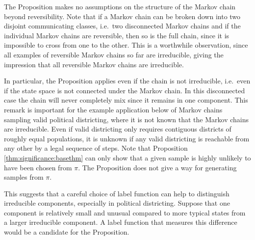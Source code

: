 \documentclass[12pt]{article}
\begin{document}
\begin{remark}
    The Proposition makes no assumptions on the structure of the Markov
    chain beyond reversibility.  Note that if a Markov chain can be
    broken down into two disjoint communicating classes, i.e.\ two
    disconnected Markov chains and if the individual Markov chains are
    reversible, then so is the full chain, since it is impossible to
    cross from one to the other.  This is a worthwhile observation,
    since all examples of reversible Markov chains so far are
    irreducible, giving the impression that all reversible Markov chains
    are irreducible.

    In particular, the Proposition applies even if the chain is not
    irreducible, i.e.\ even if the state space is not connected
    under the Markov chain.  In this disconnected case the chain will never
    completely mix since it remains in one component. This remark is
    important for the example application below of Markov chains
    sampling valid political districting, where it is not known that the
    Markov chains are irreducible.  Even if valid districting only
    requires contiguous districts of roughly equal populations, it is
    unknown if any valid districting is reachable from any other by a
    legal sequence of steps.  Note that Proposition~%
    \ref{thm:significance:basethm} can only show that a given sample is
    highly unlikely to have been chosen from \( \pi \).  The Proposition
    does not give a way for generating samples from \( \pi \).

    This suggests that a careful choice of label function can help to
    distinguish irreducible components, especially in political districting. Suppose
    that one component is relatively small and unusual compared to more
    typical states from a larger irreducible component.  A label
    function that measures this difference would be a candidate for the
    Proposition.
\end{remark}
\end{document}
